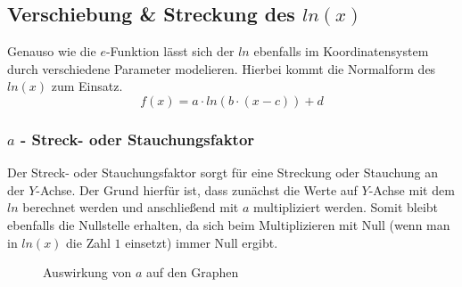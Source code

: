 \subsection{Verschiebung \& Streckung des $ln(x)$}
Genauso wie die $e$-Funktion lässt sich der $ln$ ebenfalls im Koordinatensystem durch verschiedene Parameter modelieren. Hierbei kommt die Normalform des $ln(x)$ zum Einsatz.
\[f(x)=a\cdot ln(b\cdot(x-c))+d\]
\subsubsection{$a$ - Streck- oder Stauchungsfaktor}
Der Streck- oder Stauchungsfaktor sorgt für eine Streckung oder Stauchung an der $Y$-Achse. Der Grund hierfür ist, dass zunächst die Werte auf $Y$-Achse mit dem $ln$ berechnet werden und anschließend mit $a$ multipliziert werden. Somit bleibt ebenfalls die Nullstelle erhalten, da sich beim Multiplizieren mit Null (wenn man in $ln(x)$ die Zahl $1$ einsetzt) immer Null ergibt. 
\begin{figure}[h]
\centering
	\caption{Auswirkung von $a$ auf den Graphen}
\end{figure}
\pagebreak
